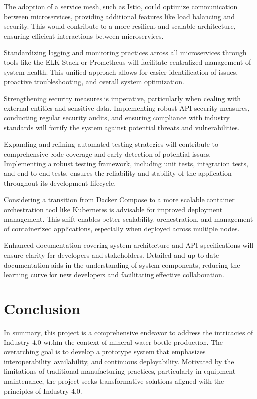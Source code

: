\documentclass[conference]{IEEEtran}
\begin{document}
The adoption of a service mesh, such as Istio, could optimize communication between microservices, providing additional features like load balancing and security. This would contribute to a more resilient and scalable architecture, ensuring efficient interactions between microservices.

Standardizing logging and monitoring practices across all microservices through tools like the ELK Stack or Prometheus will facilitate centralized management of system health. This unified approach allows for easier identification of issues, proactive troubleshooting, and overall system optimization.

Strengthening security measures is imperative, particularly when dealing with external entities and sensitive data. Implementing robust API security measures, conducting regular security audits, and ensuring compliance with industry standards will fortify the system against potential threats and vulnerabilities.

Expanding and refining automated testing strategies will contribute to comprehensive code coverage and early detection of potential issues. Implementing a robust testing framework, including unit tests, integration tests, and end-to-end tests, ensures the reliability and stability of the application throughout its development lifecycle.

Considering a transition from Docker Compose to a more scalable container orchestration tool like Kubernetes is advisable for improved deployment management. This shift enables better scalability, orchestration, and management of containerized applications, especially when deployed across multiple nodes.

Enhanced documentation covering system architecture and API specifications will ensure clarity for developers and stakeholders. Detailed and up-to-date documentation aids in the understanding of system components, reducing the learning curve for new developers and facilitating effective collaboration.


\section{Conclusion}

In summary, this project is a comprehensive endeavor to address the intricacies of Industry 4.0 within the context of mineral water bottle production. The overarching goal is to develop a prototype system that emphasizes interoperability, availability, and continuous deployability. Motivated by the limitations of traditional manufacturing practices, particularly in equipment maintenance, the project seeks transformative solutions aligned with the principles of Industry 4.0.
\end{document}
